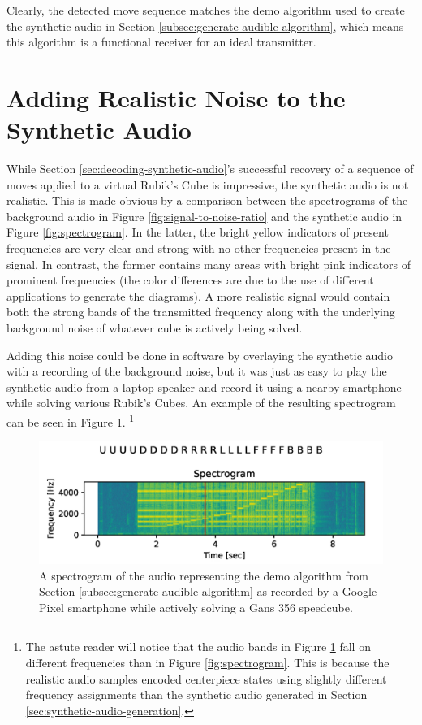 Clearly, the detected move sequence matches the demo algorithm used to create the synthetic audio in Section \ref{subsec:generate-audible-algorithm}, which means this algorithm is a functional receiver for an ideal transmitter.


\newpage
\section{Adding Realistic Noise to the Synthetic Audio}
\label{sec:adding-realistic-noise}
While Section \ref{sec:decoding-synthetic-audio}'s successful recovery of a sequence of moves applied to a virtual Rubik's Cube is impressive, the synthetic audio is not realistic.
This is made obvious by a comparison between the spectrograms of the background audio in Figure \ref{fig:signal-to-noise-ratio} and the synthetic audio in Figure \ref{fig:spectrogram}.
In the latter, the bright yellow indicators of present frequencies are very clear and strong with no other frequencies present in the signal.
In contrast, the former contains many areas with bright pink indicators of prominent frequencies (the color differences are due to the use of different applications to generate the diagrams).
A more realistic signal would contain both the strong bands of the transmitted frequency along with the underlying background noise of whatever cube is actively being solved.

Adding this noise could be done in software by overlaying the synthetic audio with a recording of the background noise, but it was just as easy to play the synthetic audio from a laptop speaker and record it using a nearby smartphone while solving various Rubik's Cubes.
An example of the resulting spectrogram can be seen in Figure \ref{fig:noisy-spectrogram}.
\footnote{The astute reader will notice that the audio bands in Figure \ref{fig:noisy-spectrogram} fall on different frequencies than in Figure \ref{fig:spectrogram}. This is because the realistic audio samples encoded centerpiece states using slightly different frequency assignments than the synthetic audio generated in Section \ref{sec:synthetic-audio-generation}.}

\begin{figure}[h]
    \centering
    \includegraphics[width=0.8\linewidth]{Figures/5 Algorithm Design/transmitted-356-5tps.png}
    \caption{A spectrogram of the audio representing the demo algorithm from Section \ref{subsec:generate-audible-algorithm} as recorded by a Google Pixel smartphone while actively solving a Gans 356 speedcube.}
    \label{fig:noisy-spectrogram}
\end{figure}

